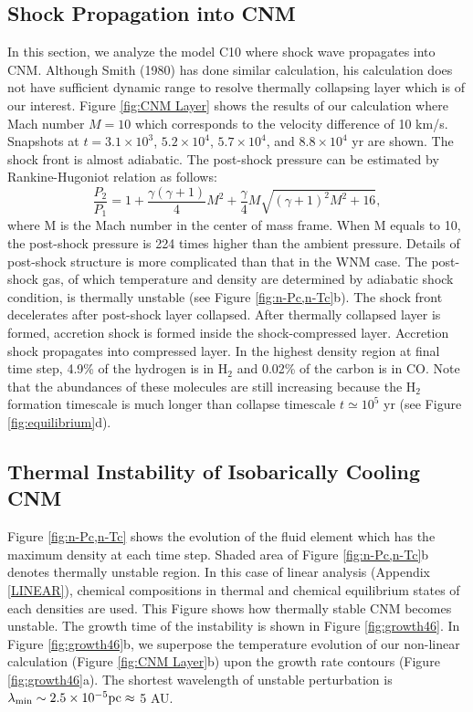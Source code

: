 \subsection{Shock Propagation into CNM}\label{subsection:CNM}

In this section, we analyze the model C10 where shock wave propagates
into CNM.
Although Smith (1980) has done similar calculation,
his calculation does not have sufficient dynamic range to resolve 
thermally collapsing layer which is of our interest.
Figure \ref{fig:CNM Layer} shows the results of our calculation
where Mach number $M=10$ 
which corresponds to the velocity difference of 10 km/s.
Snapshots at $t=3.1\times 10^3$, $5.2\times 10^4$, $5.7\times 10^4$,
and $8.8\times 10^4$ yr are shown. 
The shock front is almost adiabatic.
The post-shock pressure can be estimated by Rankine-Hugoniot relation as
follows:
\begin{equation}
\frac{P_2}{P_1}=1+\frac{\gamma(\gamma+1)}{4}M^2+\frac{\gamma}{4}M
\sqrt{(\gamma+1)^2M^2+16},
\end{equation}
where M is the Mach number in the center of mass frame.
When M equals to 10, the post-shock pressure is 224 times higher than the
ambient pressure.
Details of post-shock structure is more complicated than 
that in the WNM case.
The post-shock gas, of which temperature and density are determined by
adiabatic shock condition, is thermally unstable 
(see Figure \ref{fig:n-Pc,n-Tc}b).
The shock front decelerates after post-shock layer collapsed.
After thermally collapsed layer is formed, 
accretion shock is formed inside the shock-compressed layer.
Accretion shock propagates into compressed layer.
In the highest density region at final time step,
4.9\% of the hydrogen is in H$_2$ and 
0.02\% of the carbon is in CO.
Note that the abundances of these molecules are still increasing
because the 
H$_2$
formation timescale is much longer than collapse timescale
$t\simeq 10^5$ yr (see Figure \ref{fig:equilibrium}d).



\subsection{Thermal Instability of Isobarically Cooling CNM}

Figure \ref{fig:n-Pc,n-Tc} shows the evolution of the fluid element
which has the maximum density at each time step.
Shaded area of Figure \ref{fig:n-Pc,n-Tc}b denotes thermally unstable region.
In this case of linear analysis (Appendix \ref{LINEAR}), 
chemical compositions in thermal and chemical
equilibrium states of each densities are used. 
This Figure shows how thermally stable CNM becomes unstable.
The growth time of the instability is shown in Figure \ref{fig:growth46}.
In Figure \ref{fig:growth46}b,
we superpose the temperature evolution of our non-linear calculation 
(Figure \ref{fig:CNM Layer}b)       
upon the growth rate contours (Figure \ref{fig:growth46}a). 
The shortest wavelength of unstable perturbation is 
$\lambda_{\rm min} \sim 2.5\times 10^{-5} {\rm pc}\approx$ 5 AU.  

